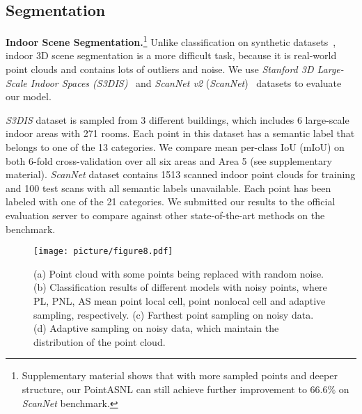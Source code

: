 \documentclass[10pt,twocolumn,letterpaper]{article}
\begin{document}
	\subsection{Segmentation}
	{\noindent\bf Indoor Scene Segmentation.}\footnote {Supplementary material shows that with more sampled points and deeper structure, our PointASNL can still achieve further improvement to 66.6\% on \textit{ScanNet} benchmark.} Unlike classification on synthetic datasets~\cite{modelnet,shapenet}, indoor 3D scene segmentation is a more difficult task, because it is real-world point clouds and contains lots of outliers and noise. We use \textit{Stanford 3D Large-Scale Indoor Spaces (S3DIS)}~\cite{s3dis} and \textit{ScanNet v2} (\textit{ScanNet})~\cite{scannet} datasets to evaluate our model.
	
	\textit{S3DIS} dataset is sampled from 3 different buildings, which includes 6 large-scale indoor areas with 271 rooms.  Each point in this dataset has a semantic label that belongs to one of the 13 categories. We compare mean per-class IoU (mIoU) on both 6-fold cross-validation over all six areas and Area 5 (see supplementary material). \textit{ScanNet} dataset contains 1513 scanned indoor point clouds for training and 100 test scans with all semantic labels unavailable. Each point has been labeled with one of the 21 categories. We submitted our results to the official evaluation server to compare against other state-of-the-art methods on the benchmark.
	
	
	\begin{figure}[!bp]
		\begin{center}
			\texttt{[image: picture/figure8.pdf]}
		\end{center}
		\caption{(a) Point cloud with some points being replaced with random noise. (b) Classification results of different models with noisy points, where PL, PNL, AS mean point local cell, point nonlocal cell and adaptive sampling, respectively. (c) Farthest point sampling on noisy data. (d) Adaptive sampling on noisy data, which maintain the distribution of the point cloud.}
		\label{fig:figure8}
		
	\end{figure}
	
\end{document}
